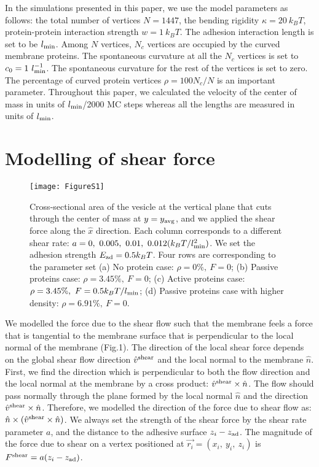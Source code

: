 \documentclass[aps,article,amsmath]{revtex4-2}
\begin{document}
In the simulations presented in this paper, we use the model parameters as follows: the total number of vertices $N=1447$, the bending rigidity $\kappa=20~k_BT$, protein-protein interaction strength $w=1~k_BT$. The adhesion interaction length is set to be $l_{\rm min}$. Among $N$ vertices, $N_c$ vertices are occupied by the curved membrane proteins. The spontaneous curvature at all the $N_c$ vertices is set to $c_0=1~l_{\rm min}^{-1}$. The spontaneous curvature for the rest of the vertices is set to zero. The percentage of curved protein vertices $\rho=100N_c/N$ is an important parameter. Throughout this paper, we calculated the velocity of the center of mass in units of $l_{\rm min}$/2000 MC steps whereas all the lengths are measured in units of $l_{\rm min}$.

\section{Modelling of shear force}
\begin{figure}
    \centering
    \texttt{[image: FigureS1]}
\caption{Cross-sectional area of the vesicle at the vertical plane that cuts through the center of mass at $y=y_{\rm avg}$, and we applied the shear force along the $\hat{x}$ direction. Each column corresponds to a different shear rate: $a=0,~0.005,~0.01,~0.012 (k_BT/l_{\rm min}^2)$. We set the adhesion strength $E_{\rm ad}=0.5 k_BT$. Four rows are corresponding to the parameter set (a) No protein case: $\rho=0\%,~F=0$; (b) Passive proteins case: $\rho=3.45\%,~F=0$; (c) Active proteins case: $\rho=3.45\%,~F=0.5 k_BT/l_{\rm min}$; (d) Passive proteins case with higher density: $\rho=6.91\%,~F=0$.}
    \label{fig:shear_model}
\end{figure}
We modelled the force due to the shear flow such that the membrane feels a force that is tangential to the membrane surface that is perpendicular to the local normal of the membrane (Fig.1). The direction of the local shear force depends on the global shear flow direction $\hat{v}^{\rm shear}$ and the local normal to the membrane $\hat{n}$. First, we find the direction which is perpendicular to both the flow direction and the local normal at the membrane by a cross product: $\hat{v}^{\rm shear}\times\hat{n}$. The flow should pass normally through the plane formed by the local normal $\hat{n}$ and the direction $\hat{v}^{\rm shear}\times\hat{n}$. Therefore, we modelled the direction of the force due to shear flow as:  
 $\hat{n}\times(\hat{v}^{\rm shear}\times\hat{n})$. We always set the strength of the shear force by the shear rate parameter $a$, and the distance to the adhesive surface $z_i-z_{\rm ad}$. The magnitude of the force due to shear on a vertex positioned at $\overrightarrow{r_i}=(x_i,~y_i,~z_i)$ is $F^{\rm shear}=a(z_i-z_{\rm ad})$. 
\end{document}
